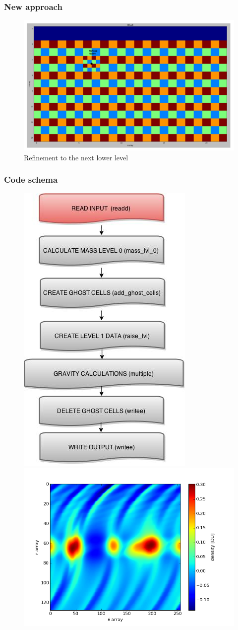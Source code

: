 \documentclass{beamer}
\begin{document}
\begin{frame}
\frametitle{New approach}

\begin{figure}

\includegraphics[width = \textwidth]{./cells_ref.png}

\caption{Refinement to the next lower level}
\end{figure}

\end{frame}



\begin{frame}
\frametitle{Code schema}

\begin{figure}

\includegraphics[width = .25\textwidth]{./Diagram1.jpg}
\includegraphics[width = .5\textwidth]{./density.png}
\end{figure}

\end{frame}
\end{document}
